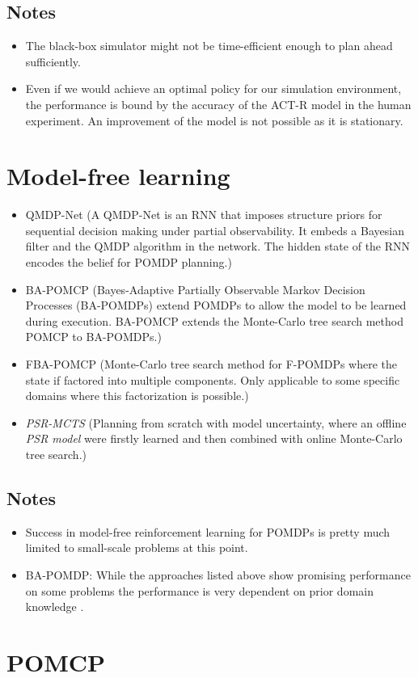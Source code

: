 \subsection{Notes}

\begin{itemize}
    \item The black-box simulator might not be time-efficient enough to plan ahead sufficiently.
    \item Even if we would achieve an optimal policy for our simulation environment, the performance is bound by the accuracy of the ACT-R model in the human experiment. An improvement of the model is not possible as it is stationary.
\end{itemize}

\section{Model-free learning}

\begin{itemize}
    \item QMDP-Net (A QMDP-Net is an RNN that imposes structure priors for sequential decision making under partial observability. It embeds a Bayesian filter and the QMDP algorithm in the network. The hidden state of the RNN encodes the belief for POMDP planning.)
    \item BA-POMCP (Bayes-Adaptive Partially Observable Markov Decision Processes (BA-POMDPs) extend POMDPs to allow the model to be learned during execution. BA-POMCP extends the Monte-Carlo tree search method POMCP to BA-POMDPs.)
    \item FBA-POMCP (Monte-Carlo tree search method for F-POMDPs where the state if factored into multiple components. Only applicable to some specific domains where this factorization is possible.)
    \item \emph{PSR-MCTS} (Planning from scratch with model uncertainty, where an offline \emph{PSR model} were firstly learned and then combined with online Monte-Carlo tree search.)
\end{itemize}

\subsection{Notes}

\begin{itemize}
    \item Success in model-free reinforcement learning for POMDPs is pretty much limited to small-scale problems at this point.
    \item BA-POMDP: While the approaches listed above show promising performance on some problems the performance is very dependent on prior domain knowledge \parencite{ba-pomdp-online-offline}.
\end{itemize}

\section{POMCP}